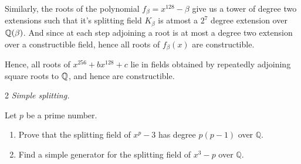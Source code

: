 \documentclass[12pt]{article}
\begin{document}
\begin{solution}
\begin{enumerate}
        Similarly, the roots of the polynomial $f_{\beta} = x^{128} - \beta$ give us a tower of degree two extensions such that it's splitting field $K_\beta$ is atmost a $2^7$ degree extension over $\mathbb Q(\beta)$. And since at each step adjoining a root is at most a degree two extension over a constructible field, hence all roots of $f_{\beta}(x)$ are constructible.  

        Hence, all roots of $x^{256} +bx^{128}+c$ lie in fields obtained by repeatedly adjoining square roots to $\mathbb Q$, and hence are constructible.   
    \end{enumerate} 
\end{solution}

\newpage 

\begin{problem}{2}
\textit{Simple splitting.}

Let $p$ be a prime number.
\begin{enumerate}
    \item[(a)] Prove that the splitting field of $x^p-3$ has degree $p(p-1)$ over $\mathbb{Q}$.

    \item[(b)] Find a simple generator for the splitting field of $x^3-p$ over $\mathbb{Q}$.
\end{enumerate}
\end{problem}
\end{document}
